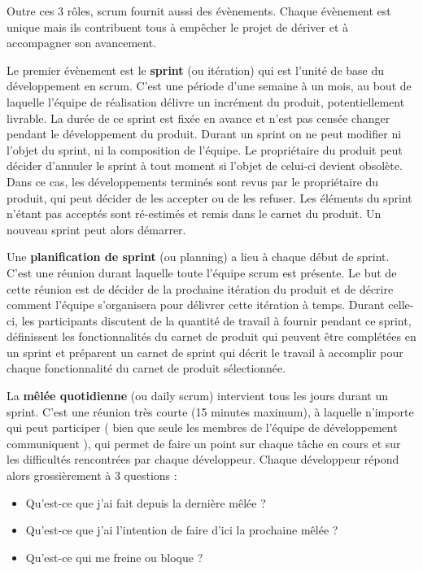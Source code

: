 \documentclass[12pt]{report}
\begin{document}
Outre ces 3 rôles, scrum fournit aussi des évènements. Chaque évènement est unique mais ils contribuent tous à empêcher le projet de dériver et à accompagner son avancement.

Le premier évènement est le \textbf{sprint} (ou itération) qui est l'unité de base du développement en scrum. C'est une période d'une semaine à un mois, au bout de laquelle l'équipe de réalisation délivre un incrément du produit, potentiellement livrable. La durée de ce sprint est fixée en avance et n'est pas censée changer pendant le développement du produit. Durant un sprint on ne peut modifier ni l'objet du sprint, ni la composition de l'équipe. Le propriétaire du produit peut décider d'annuler le sprint à tout moment si l'objet de celui-ci devient obsolète. Dans ce cas, les développements terminés sont revus par le propriétaire du produit, qui peut décider de les accepter ou de les refuser. Les éléments du sprint n'étant pas acceptés sont ré-estimés et remis dans le carnet du produit. Un nouveau sprint peut alors démarrer.

Une \textbf{planification de sprint} (ou planning) a lieu à chaque début de sprint. C'est une réunion durant laquelle toute l'équipe scrum est présente. Le but de cette réunion est de décider de la prochaine itération du produit et de décrire comment l'équipe s'organisera pour délivrer cette itération à temps. Durant celle-ci, les participants discutent de la quantité de travail à fournir pendant ce sprint, définissent les fonctionnalités du carnet de produit qui peuvent être complétées en un sprint et préparent un carnet de sprint qui décrit le travail à accomplir pour chaque fonctionnalité du carnet de produit sélectionnée.

La \textbf{mêlée quotidienne} (ou daily scrum) intervient tous les jours durant un sprint. C'est une réunion très courte (15 minutes maximum), à laquelle n'importe qui peut participer ( bien que seule les membres de l'équipe de développement communiquent ), qui permet de faire un point sur chaque tâche en cours et sur les difficultés rencontrées par chaque développeur.
Chaque développeur répond alors grossièrement à 3 questions :
\begin{itemize}
\item Qu'est-ce que j'ai fait depuis la dernière mêlée ?
\item Qu'est-ce que j'ai l'intention de faire d'ici la prochaine mêlée ?
\item Qu'est-ce qui me freine ou bloque ?
\end{itemize}
\end{document}
